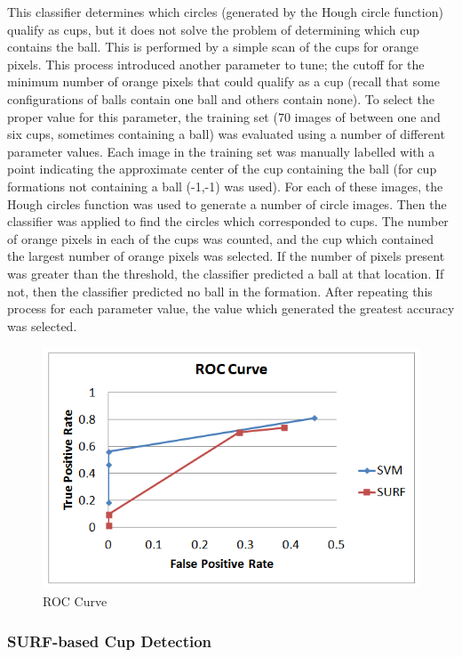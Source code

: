 \documentclass[letterpaper, 10 pt, conference]{ieeeconf}  %
\begin{document}
This classifier determines which circles (generated by the Hough circle function) qualify as cups, but it does not solve the problem of determining which cup contains the ball.  This is performed by a simple scan of the cups for orange pixels.  This process introduced another parameter to tune; the cutoff for the minimum number of orange pixels that could qualify as a cup (recall that some configurations of balls contain one ball and others contain none).  To select the proper value for this parameter, the training set (70 images of between one and six cups, sometimes containing a ball) was evaluated using a number of different parameter values.  Each image in the training set was manually labelled with a point indicating the approximate center of the cup containing the ball (for cup formations not containing a ball (-1,-1) was used).  For each of these images, the Hough circles function was used to generate a number of circle images.  Then the classifier was applied to find the circles which corresponded to cups.  The number of orange pixels in each of the cups was counted, and the cup which contained the largest number of orange pixels was selected.  If the number of pixels present was greater than the threshold, the classifier predicted a ball at that location.  If not, then the classifier predicted no ball in the formation.  After repeating this process for each parameter value, the value which generated the greatest accuracy was selected.

\begin{figure}[thpb]
      \centering
	  \includegraphics[scale =0.5]{ROC}
      \caption{ROC Curve}
      \label{fig:ROC}
\end{figure}

\subsubsection{SURF-based Cup Detection}
\end{document}
